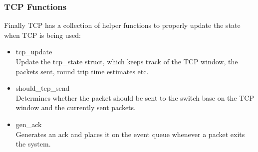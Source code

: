 \documentclass[11pt]{article}%
\begin{document}
\subsubsection{TCP Functions}
Finally TCP has a collection of helper functions to properly update the state when TCP is being used: 
\begin{itemize}
\item tcp\_update\\
Update the tcp\_state struct, which keeps track of the TCP window, the packets sent, round trip time estimates etc.
\item should\_tcp\_send\\
Determines whether the packet should be sent to the switch base on the TCP window and the currently sent packets.
\item gen\_ack\\
Generates an ack and places it on the event queue whenever a packet exits the system.
\end{itemize}
\end{document}
